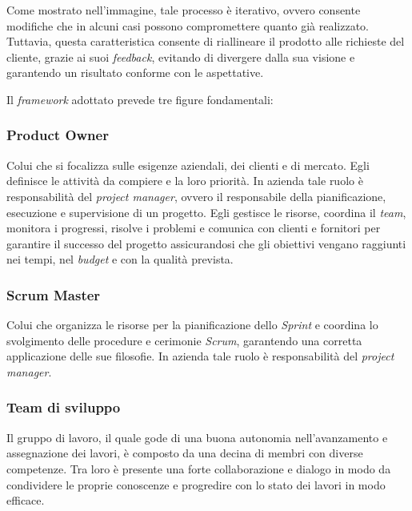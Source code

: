 \noindent Come mostrato nell'immagine, tale processo è iterativo, ovvero consente modifiche che in alcuni casi possono compromettere quanto già realizzato. Tuttavia, questa caratteristica consente di riallineare il prodotto alle richieste del cliente, grazie ai suoi \emph{feedback}, evitando di divergere dalla sua visione e garantendo un risultato conforme con le aspettative.

\noindent Il \emph{framework} adottato prevede tre figure fondamentali: 
\subsubsection*{Product Owner}
Colui che si focalizza sulle esigenze aziendali, dei clienti e di mercato. Egli definisce le attività da compiere e la loro priorità.
In azienda tale ruolo è responsabilità del \emph{project manager}, ovvero il responsabile della pianificazione, esecuzione e supervisione di un progetto. Egli gestisce le risorse, coordina il \emph{team}, monitora i progressi, risolve i problemi e comunica con clienti e fornitori per garantire il successo del progetto assicurandosi che gli obiettivi vengano raggiunti nei tempi, nel \emph{budget} e con la qualità prevista.  

\subsubsection*{Scrum Master}
Colui che organizza le risorse per la pianificazione dello \emph{Sprint} e coordina lo svolgimento delle procedure e cerimonie \emph{Scrum}, garantendo una corretta applicazione delle sue filosofie.
In azienda tale ruolo è responsabilità del \emph{project manager}. 

\subsubsection*{Team di sviluppo}
Il gruppo di lavoro, il quale gode di una buona autonomia nell'avanzamento e assegnazione dei lavori, è composto da una decina di membri con diverse competenze. Tra loro è presente una forte collaborazione e dialogo in modo da condividere le proprie conoscenze e progredire con lo stato dei lavori in modo efficace.\\\\

